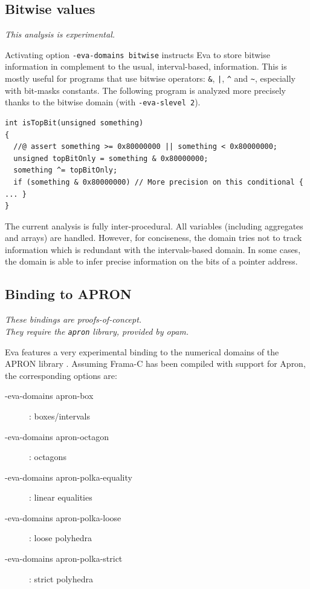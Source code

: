 \documentclass[web]{frama-c-book}
\newcommand{\Eva}{\textsf{Eva}}
\begin{document}
\subsection{Bitwise values}
\label{sec:bitwise}

\emph{This analysis is experimental.}

Activating option \texttt{-eva-domains bitwise} instructs \Eva{} to store
bitwise information in complement to the usual, interval-based, information.
This is mostly useful for programs that use bitwise operators: \verb+&+,
\verb+|+, \verb+^+ and \verb+~+, especially with bit-masks constants.
The following program is analyzed more precisely thanks to the bitwise
domain (with \lstinline+-eva-slevel 2+).
\begin{lstlisting}
int isTopBit(unsigned something)
{
  //@ assert something >= 0x80000000 || something < 0x80000000;
  unsigned topBitOnly = something & 0x80000000;
  something ^= topBitOnly;
  if (something & 0x80000000) // More precision on this conditional { ... } 
}  
\end{lstlisting}

The current analysis is fully inter-procedural. All variables (including
aggregates and arrays) are handled. However, for conciseness, the domain tries
not to track information which is redundant with the intervals-based domain. In
some cases, the domain is able to infer precise information on the bits of a
pointer address.

\subsection{Binding to APRON}
\label{sec:apron}

\emph{These bindings are proofs-of-concept.\\
  They require the \texttt{apron} library, provided by opam.}

\Eva{} features a very experimental binding to the numerical domains of
the APRON library \cite{DBLP:conf/cav/JeannetM09}. Assuming Frama-C has been
compiled with support for Apron, the corresponding options are:

\begin{description}
\item[-eva-domains apron-box]: boxes/intervals
\item[-eva-domains apron-octagon]:  octagons
\item[-eva-domains apron-polka-equality]:  linear equalities
\item[-eva-domains apron-polka-loose]: loose polyhedra
\item[-eva-domains apron-polka-strict]: strict polyhedra
\end{description}
\end{document}
